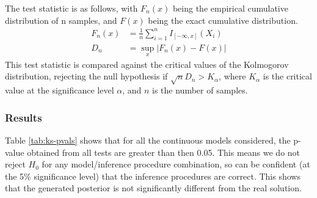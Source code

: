 The test statistic is as follows, with $F_n(x)$ being the empirical cumulative distribution of n samples, and $F(x)$ being the exact cumulative distribution.
\begin{align*}
	F_{n}(x) & =\frac{1}{n}\sum_{i=1}^{n}I_{[-\infty ,x]}(X_{i}) \\
	D_{n}    & =\sup_{x}|F_{n}(x)-F(x)|                          
\end{align*}
This test statistic is compared against the critical values of the Kolmogorov distribution, rejecting the null hypothesis if $\sqrt{n}D_n > K_\alpha$, where $K_\alpha$ is the critical value at the significance level $\alpha$, and $n$ is the number of samples.

\subsubsection{Results}

Table \ref{tab:ks-pvals} shows that for all the continuous models considered, the p-value obtained from all tests are greater than then 0.05. This means we do not reject $H_0$ for any model/inference procedure combination, so can be confident (at the 5\% significance level) that the inference procedures are correct. This shows that the generated posterior is not significantly different from the real solution.

\begin{table}[!ht]
	\centering
	\caption{p-values of K-S test on different models using different inference procedures}
	\label{tab:ks-pvals}
\end{table}


